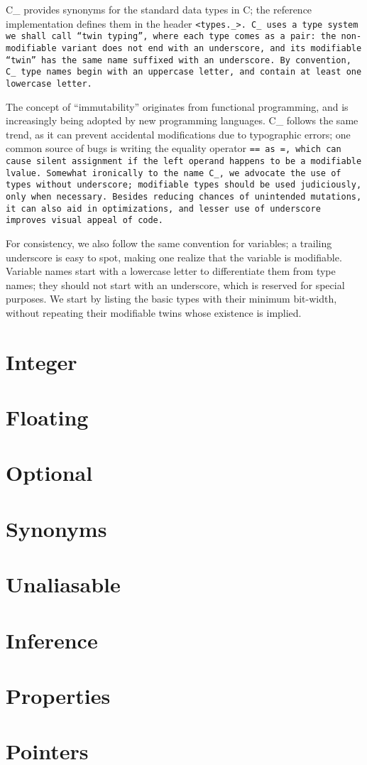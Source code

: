 \def\Section#1{\section{#1}}

C\_ provides synonyms for the standard data types in C;
the reference implementation defines them in the header \tt{<types._>}.
C\_ uses a type system we shall call ``twin typing'',
where each type comes as a pair:
the non-modifiable variant does not end with an underscore,
and its modifiable ``twin'' has the same name suffixed with an underscore.
By convention, C\_ type names begin with an uppercase letter,
and contain at least one lowercase letter.

The concept of ``immutability'' originates from functional programming,
and is increasingly being adopted by new programming languages.
C\_ follows the same trend,
as it can prevent accidental modifications due to typographic errors;
one common source of bugs is writing the equality operator \tt{==} as \tt{=},
which can cause silent assignment if the left
operand happens to be a modifiable lvalue.
Somewhat ironically to the name C\_, we advocate the use of types without
underscore; modifiable types should be used judiciously, only when necessary.
Besides reducing chances of unintended mutations, it can also aid in
optimizations, and lesser use of underscore improves visual appeal of code.

For consistency, we also follow the same convention for variables; a trailing
underscore is easy to spot, making one realize that the variable is modifiable.
Variable names start with a lowercase letter to differentiate
them from type names; they should not start with an underscore,
which is reserved for special purposes.
We start by listing the basic types with their minimum bit-width,
without repeating their modifiable twins whose existence is implied.

\Section{Integer}

\Section{Floating}

\Section{Optional}

\section{}


\Section{Synonyms}

\section{}


\Section{Unaliasable}

\Section{Inference}

\Section{Properties}

\Section{Pointers}
